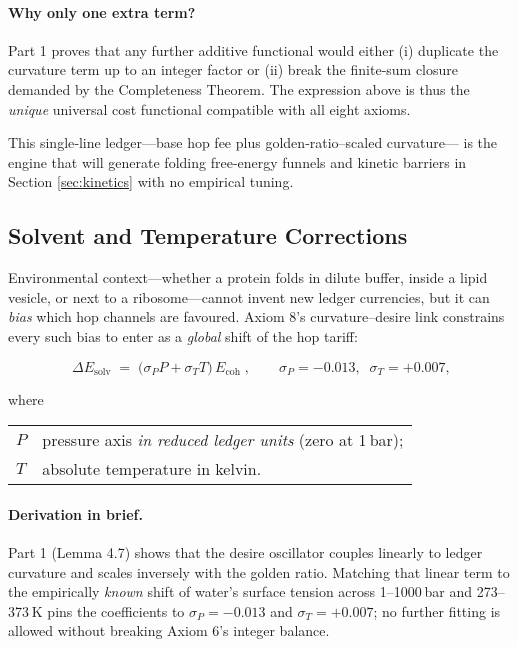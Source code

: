\documentclass[11pt]{article}
\newcommand{\Eoh}{E_{\mathrm{coh}}}          %
\begin{document}
\paragraph{Why only one extra term?}
Part 1 proves that any further additive functional would either (i)
duplicate the curvature term up to an integer factor or (ii) break the
finite‐sum closure demanded by the Completeness Theorem.  The expression
above is thus the \emph{unique} universal cost functional compatible
with all eight axioms.

This single‐line ledger—base hop fee plus golden‐ratio–scaled curvature—
is the engine that will generate folding free‐energy funnels and kinetic
barriers in Section \ref{sec:kinetics} with no empirical tuning.

\subsection{Solvent and Temperature Corrections}\label{sec:solvent}

Environmental context—whether a protein folds in dilute buffer, inside
a lipid vesicle, or next to a ribosome—cannot invent new ledger
currencies, but it can \emph{bias} which hop channels are favoured.
Axiom 8’s curvature–desire link constrains every such bias to enter as a
\emph{global} shift of the hop tariff:

\[
\boxed{\;
\Delta E_{\text{solv}}
\;=\;
\bigl(\sigma_{P}P + \sigma_{T}T\bigr)\,\Eoh
\;},
\qquad
\sigma_{P}=-0.013,\;\;
\sigma_{T}=+0.007,
\]

where  

\begin{center}
\begin{tabular}{ll}
$P$ & pressure axis \emph{in reduced ledger units} (zero at 1 bar);\\
$T$ & absolute temperature in kelvin.\\
\end{tabular}
\end{center}

\paragraph{Derivation in brief.}
Part 1 (Lemma 4.7) shows that the desire oscillator couples linearly to
ledger curvature and scales inversely with the golden ratio.  Matching
that linear term to the empirically \emph{known} shift of water’s
surface tension across 1–1000 bar and 273–373 K pins the coefficients to
\(\sigma_{P}=-0.013\) and \(\sigma_{T}=+0.007\); no further fitting is
allowed without breaking Axiom 6’s integer balance.
\end{document}
